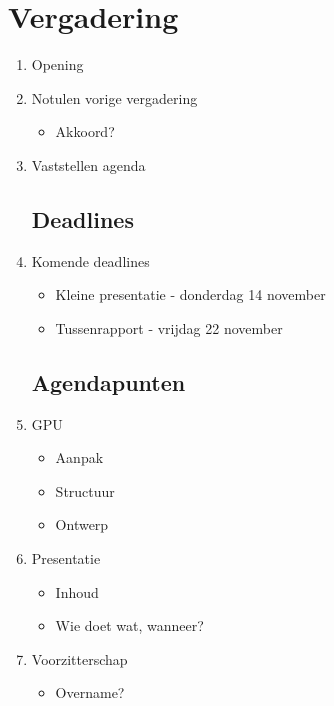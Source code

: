 \documentclass{article}
\begin{document}
\section*{Vergadering}
\begin{enumerate}
	
	\subsection*{Vooraf}
	\item Opening
	\item Notulen vorige vergadering
	\begin{itemize}
		\item Akkoord?
	\end{itemize}
	\item Vaststellen agenda

	\subsection*{Deadlines}
	\item Komende deadlines
	\begin{itemize}
		\item Kleine presentatie - donderdag 14 november
		\item Tussenrapport - vrijdag 22 november
	\end{itemize}

	\subsection*{Agendapunten}

	\item GPU
	\begin{itemize}
		\item Aanpak
		\item Structuur
		\item Ontwerp
	\end{itemize}

	\item Presentatie
	\begin{itemize}
		\item Inhoud
		\item Wie doet wat, wanneer?
	\end{itemize}

	\item Voorzitterschap
	\begin{itemize}
		\item Overname?
	\end{itemize}


\end{enumerate}
\end{document}
